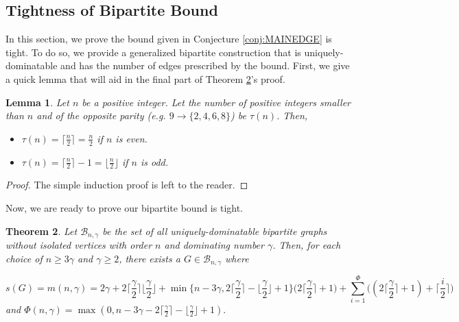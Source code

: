 \documentclass[12pt]{amsart}
\newcommand{\floor}[1]{\lfloor{#1}\rfloor}
\newcommand{\ceil}[1]{\lceil{#1}\rceil}
\newtheorem{thm}{Theorem}
\newtheorem{lemma}[thm]{Lemma}
\begin{document}
\subsection{Tightness of Bipartite Bound}\label{sect:Tightness}
In this section, we prove the bound given in Conjecture \ref{conj:MAINEDGE} is tight. To do so, we provide a generalized bipartite construction that is uniquely-dominatable and has the number of edges prescribed by the bound. First, we give a quick lemma that will aid in the final part of Theorem \ref{thm:Constructions}'s proof.
\begin{lemma}\label{lma:SmallerPosInts}
   Let $n$ be a positive integer. Let the number of positive integers smaller than $n$ and of the opposite parity (e.g. $9 \rightarrow \{2,4,6,8\}$) be $\tau(n)$. Then,
   \begin{itemize}
       \item$\tau(n) =  \ceil{\frac{n}{2}} = \frac{n}{2}$ if $n$ is even.
       \item $\tau(n) = \ceil{\frac{n}{2}} - 1 = \floor{\frac{n}{2}}$ if $n$ is odd.
   \end{itemize}
\end{lemma}
\begin{proof}
   The simple induction proof is left to the reader.
\end{proof}
Now, we are ready to prove our bipartite bound is tight.
\begin{thm}\label{thm:Constructions}
 Let $\mathcal{B}_{n,\gamma}$ be the set of all uniquely-dominatable bipartite graphs without isolated vertices with order $n$ and dominating number $\gamma$. Then, for each choice of $n\geq 3\gamma$ and $\gamma \geq 2$, there exists a $G \in \mathcal{B}_{n,\gamma}$ where

    $$s(G) = m(n,\gamma) = 2 \gamma + 2 \Big\lceil \frac{\gamma}{2} \Big\rceil \Big\lfloor \frac{\gamma}{2} \Big\rfloor + \min\Big\{n-3\gamma, 2 \Big\lceil \frac{\gamma}{2} \Big\rceil - \Big\lfloor \frac{\gamma}{2}\Big\rfloor+ 1\Big\}\Big(2\Big\lceil\frac{\gamma}{2}\Big\rceil + 1\Big) + \sum_{i=1}^\Phi \Big((2\Big\lceil\frac{\gamma}{2}\Big\rceil+1) + \Big\lceil\frac{i}{2}\Big\rceil\Big)$$
and $\Phi(n,\gamma) = \max(0, n-3\gamma - 2\lceil\frac{\gamma}{2}\rceil - \lfloor\frac{\gamma}{2}\rfloor + 1).$
\end{thm}
\end{document}
